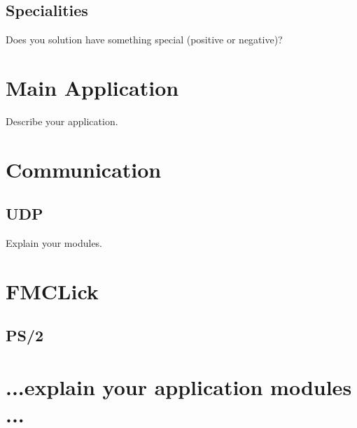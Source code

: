 \documentclass[12pt,a4paper,titlepage,oneside]{article}
\begin{document}
\subsection{Specialities}

Does you solution have something special (positive or negative)?


\section{Main Application}

Describe your application.


\section{Communication}

\subsection{UDP}

Explain your modules.

\section{FMCLick}

\subsection{PS/2}


\section{...explain your application modules ...}
\end{document}
